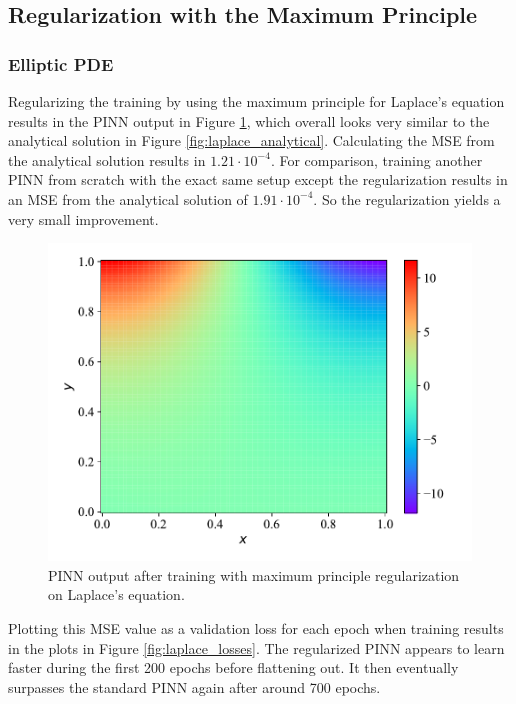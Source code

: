 \subsection{Regularization with the Maximum Principle}

\subsubsection{Elliptic PDE}

Regularizing the training by using the maximum principle for Laplace's equation results in the PINN output in Figure \ref{fig:laplace_trained}, which overall looks very similar to the analytical solution in Figure \ref{fig:laplace_analytical}. Calculating the MSE from the analytical solution results in $1.21 \cdot 10^{-4}$. For comparison, training another PINN from scratch with the exact same setup except the regularization results in an MSE from the analytical solution of $1.91 \cdot 10^{-4}$. So the regularization yields a very small improvement.

\begin{figure}[H]
    \centering
    \includegraphics[width=1.0\linewidth]{Figures/IntermediateExperiments/Laplace/laplace_forward.pdf}
    \caption{PINN output after training with maximum principle regularization on Laplace's equation.}
    \label{fig:laplace_trained}
\end{figure}

Plotting this MSE value as a validation loss for each epoch when training results in the plots in Figure \ref{fig:laplace_losses}. The regularized PINN appears to learn faster during the first 200 epochs before flattening out. It then eventually surpasses the standard PINN again after around 700 epochs.

